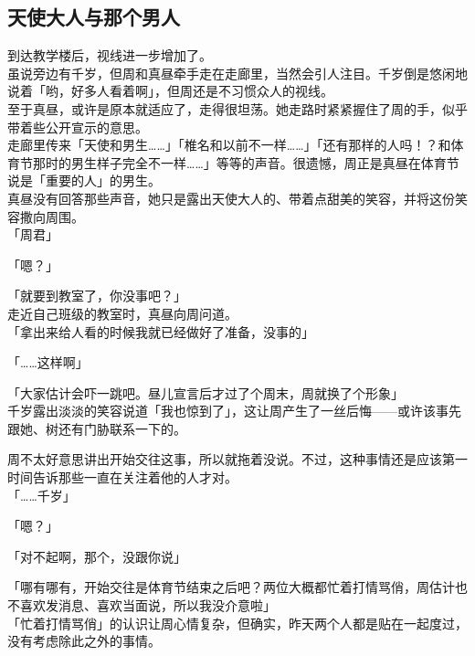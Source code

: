 \subsection{天使大人与那个男人}

到达教学楼后，视线进一步增加了。\\

虽说旁边有千岁，但周和真昼牵手走在走廊里，当然会引人注目。千岁倒是悠闲地说着「哟，好多人看着啊」，但周还是不习惯众人的视线。\\

至于真昼，或许是原本就适应了，走得很坦荡。她走路时紧紧握住了周的手，似乎带着些公开宣示的意思。\\

走廊里传来「天使和男生……」「椎名和以前不一样……」「还有那样的人吗！？和体育节那时的男生样子完全不一样……」等等的声音。很遗憾，周正是真昼在体育节说是「重要的人」的男生。\\

真昼没有回答那些声音，她只是露出天使大人的、带着点甜美的笑容，并将这份笑容撒向周围。\\

「周君」

「嗯？」

「就要到教室了，你没事吧？」\\

走近自己班级的教室时，真昼向周问道。\\

「拿出来给人看的时候我就已经做好了准备，没事的」

「……这样啊」

「大家估计会吓一跳吧。昼儿宣言后才过了个周末，周就换了个形象」\\

千岁露出淡淡的笑容说道「我也惊到了」，这让周产生了一丝后悔——或许该事先跟她、树还有门胁联系一下的。

周不太好意思讲出开始交往这事，所以就拖着没说。不过，这种事情还是应该第一时间告诉那些一直在关注着他的人才对。\\

「……千岁」

「嗯？」

「对不起啊，那个，没跟你说」

「哪有哪有，开始交往是体育节结束之后吧？两位大概都忙着打情骂俏，周估计也不喜欢发消息、喜欢当面说，所以我没介意啦」\\

「忙着打情骂俏」的认识让周心情复杂，但确实，昨天两个人都是贴在一起度过，没有考虑除此之外的事情。

